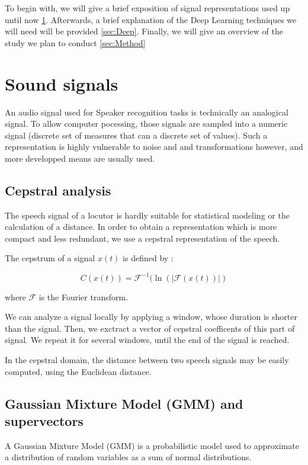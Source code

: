 \documentclass[conference]{IEEEtran}
\begin{document}
To begin with, we will give a brief exposition of signal representations used
up until now \ref{sec:signal}. Afterwards, a brief explanation of the Deep
Learning techniques we will need will be provided \ref{sec:Deep}. Finally, we
will give an overview of the study we plan to conduct \ref{sec:Method}

\section{Sound signals}
\label{sec:signal}
An audio signal used for Speaker recognition tasks is technically an analogical
signal. To allow computer pocessing, those signals are sampled into a numeric
signal (discrete set of measures that can a discrete set of values). Such a
representation is highly vulnerable to noise and and transformations however,
and more developped means are usually used.

\subsection{Cepstral analysis}

The speech signal of a locutor is hardly suitable for statistical modeling or
the calculation of a distance.
In order to obtain a representation which is more compact and less redundant, we
use a cepstral representation of the speech. 

The cepstrum of a signal $x(t)$ is defined by :

\begin{equation}
C(x(t)) = \mathcal{F}^{-1}(\ln(|\mathcal{F}(x(t))|)  
\end{equation}

where $\mathcal{F}$ is the Fourier transform.


We can analyze a signal locally by applying a window, whose duration is shorter
than the signal. Then, we exctract a vector of cepstral coefficents of this part
of signal. We repeat it for several windows, until the end of the signal is
reached. 

In the cepstral domain, the distance between two speech signals may be easily
computed, using the Euclidean distance. 


\subsection{Gaussian Mixture Model (GMM) and supervectors}

A Gaussian Mixture Model (GMM) is a probabilistic model used to approximate a 
distribution of random variables as a sum of normal distributions. 
\end{document}
